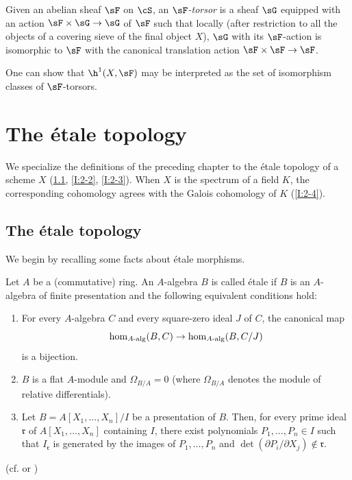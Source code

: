 \subsubsection*{}\label{I:1-6-6}

Given an abelian sheaf $\sF$ on $\cS$, an \emph{$\sF$-torsor} is a
sheaf $\sG$ equipped with an action $\sF\times\sG\to\sG$ of $\sF$
such that locally (after restriction to all the objects of a covering
sieve of the final object $X$), $\sG$ with its $\sF$-action is
isomorphic to $\sF$ with the canonical translation action
$\sF\times\sF\to\sF$.

One can show that $\h^1(X,\sF)$ may be interpreted as the set of
isomorphism classes of $\sF$-torsors.

\section{The étale topology}\label{I:2}

We specialize the definitions of the preceding chapter to the étale
topology of a scheme $X$ (\ref{I:2-1}, \ref{I:2-2}, \ref{I:2-3}). When
$X$ is the spectrum of a field $K$, the corresponding cohomology agrees
with the Galois cohomology of $K$ (\ref{I:2-4}).

\subsection{The étale topology}\label{I:2-1}

We begin by recalling some facts about étale morphisms.

\begin{definition}\label{I:2-1-1}
Let $A$ be a (commutative) ring. An $A$-algebra $B$ is called étale if
$B$ is an $A$-algebra of finite presentation and the following equivalent
conditions hold:
\begin{enumerate}[\indent a)]
  \item For every $A$-algebra $C$ and every square-zero ideal $J$ of $C$,
    the canonical map
    \[
      \hom_{A\textnormal{-alg}}(B,C) \to \hom_{A\textnormal{-alg}}(B,C/J)
    \]
    is a bijection.
  \item $B$ is a flat $A$-module and $\Omega_{B/A}=0$ (where
    $\Omega_{B/A}$ denotes the module of relative differentials).
  \item Let $B=A[X_1,\dotsc,X_n]/I$ be a presentation of $B$. Then, for
    every prime ideal $\mathfrak r$ of $A[X_1,\dotsc,X_n]$ containing $I$, there exist polynomials $P_1,\dotsc,P_n\in I$ such that $I_{\mathfrak r}$ is generated by the images of $P_1,\dotsc,P_n$ and $\det(\partial P_i/\partial X_j)\notin\mathfrak r$.
\end{enumerate}
\end{definition}
(cf.  or )


